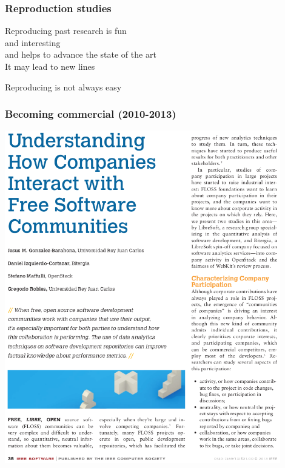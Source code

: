 \documentclass[17pt,aspectratio=169,hyperref=pdfusetitle]{beamer}
\begin{document}
\begin{frame}[fragile]
  \frametitle{Reproduction studies}

  Reproducing past research is fun \\
  and interesting \\
  and helps to advance the state of the art \\
  It may lead to new lines \\
  
  \begin{center}
    Reproducing is not always easy
  \end{center}  
  
\end{frame}

\begin{frame}[fragile]
  \frametitle{Becoming commercial (2010-2013)}

  \begin{center}
  \includegraphics[width=12cm]{figs/software-companies}
  \end{center}  
  
\end{frame}
\end{document}
